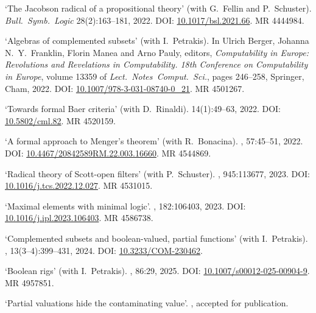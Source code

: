 \documentclass[a4paper]{article}
\begin{document}
\begin{flushleft}
\begin{thebibliography}{10}
\newblock `The {J}acobson radical of a propositional theory' (with G.~Fellin and P.~Schuster).
\newblock \emph{Bull.~Symb.~Logic} 28(2):163--181, 2022.
\newblock DOI: \href{https://doi.org/10.1017/bsl.2021.66}{10.1017/bsl.2021.66}.
\newblock MR 4444984.

\newblock `Algebras of complemented subsets' (with I.~Petrakis).
\newblock  In Ulrich Berger, Johanna N.~Y.~Franklin, Florin Manea and Arno Pauly, editors, {\em Computability in Europe: Revolutions and Revelations in Computability. 18th Conference on Computability in Europe},
\newblock volume 13359 of {\em Lect.~Notes~Comput.~Sci.}, pages 246--258, Springer, Cham, 2022.
\newblock DOI: \href{https://doi.org/10.1007/978-3-031-08740-0_21}{10.1007/978-3-031-08740-0\_21}.
\newblock MR 4501267.

\newblock `Towards formal Baer criteria' (with D.~Rinaldi).
 14(1):49--63, 2022.
\newblock DOI: \href{https://doi.org/10.5802/cml.82}{10.5802/cml.82}.
\newblock MR 4520159.

\newblock `A formal approach to Menger's theorem' (with R.~Bonacina).
, 57:45--51, 2022.
\newblock DOI: \href{https://doi.org/10.4467/20842589RM.22.003.16660}{10.4467/20842589RM.22.003.16660}.
\newblock MR 4544869.

\newblock `Radical theory of Scott-open filters' (with P.~Schuster).
, 945:113677, 2023.
\newblock DOI: \href{https://doi.org/10.1016/j.tcs.2022.12.027}{10.1016/j.tcs.2022.12.027}.
\newblock MR 4531015.

\newblock `Maximal elements with minimal logic'.
, 182:106403, 2023.
\newblock DOI: \href{https://doi.org/10.1016/j.ipl.2023.106403}{10.1016/j.ipl.2023.106403}.
\newblock MR 4586738.

\newblock `Complemented subsets and boolean-valued, partial functions' (with I.~Petrakis).
, 13(3--4):399--431, 2024.
\newblock DOI: \href{https://doi.org/10.3233/COM-230462}{10.3233/COM-230462}.

\newblock `Boolean rigs' (with I.~Petrakis).
, 86:29, 2025.
\newblock DOI: \href{}{10.1007/s00012-025-00904-9}.
\newblock MR 4957851.

\newblock `Partial valuations hide the contaminating value'.
, accepted for publication.


\end{thebibliography}


\end{flushleft}
\end{document}
